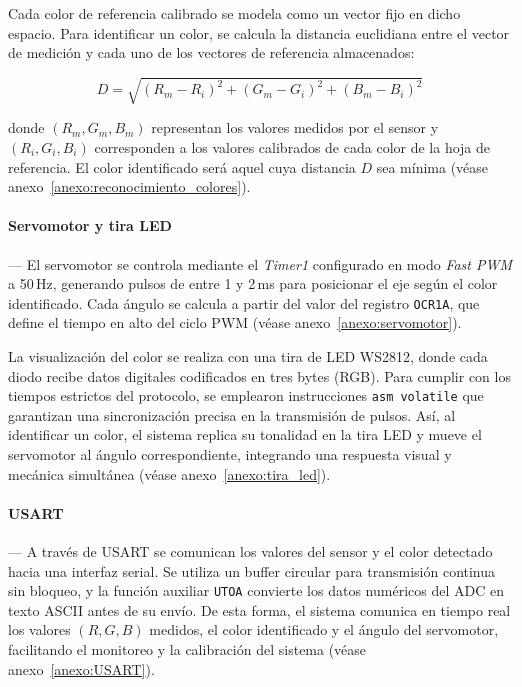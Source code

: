     \vspace{1em}

    Cada color de referencia calibrado se modela como un vector fijo en dicho espacio. Para identificar un color, se calcula la distancia euclidiana entre el vector de medición y cada uno de los vectores de referencia almacenados:

    \begin{equation}\label{eq:distancia_color}
    D = \sqrt{(R_m - R_i)^2 + (G_m - G_i)^2 + (B_m - B_i)^2}
    \end{equation}

    donde $(R_m, G_m, B_m)$ representan los valores medidos por el sensor y $(R_i, G_i, B_i)$ corresponden a los valores calibrados de cada color de la hoja de referencia. El color identificado será aquel cuya distancia $D$ sea mínima (véase anexo~\ref{anexo:reconocimiento_colores}).

    \paragraph*{\textbf{Servomotor y tira LED}}---
    El servomotor se controla mediante el \textit{Timer1} configurado en modo \textit{Fast PWM} a 50\,Hz, generando pulsos de entre 1 y 2\,ms para posicionar el eje según el color identificado. Cada ángulo se calcula a partir del valor del registro \texttt{OCR1A}, que define el tiempo en alto del ciclo PWM (véase anexo~\ref{anexo:servomotor}).

    \vspace{1em}

    La visualización del color se realiza con una tira de LED WS2812, donde cada diodo recibe datos digitales codificados en tres bytes (RGB). Para cumplir con los tiempos estrictos del protocolo, se emplearon instrucciones \texttt{asm volatile} que garantizan una sincronización precisa en la transmisión de pulsos. Así, al identificar un color, el sistema replica su tonalidad en la tira LED y mueve el servomotor al ángulo correspondiente, integrando una respuesta visual y mecánica simultánea (véase anexo~\ref{anexo:tira_led}).

    \vspace{1em}

    \paragraph*{\textbf{USART}}---
   A través de USART se comunican los valores del sensor y el color detectado hacia una interfaz serial. Se utiliza un buffer circular para transmisión continua sin bloqueo, y la función auxiliar \texttt{UTOA} convierte los datos numéricos del ADC en texto ASCII antes de su envío. De esta forma, el sistema comunica en tiempo real los valores $(R, G, B)$ medidos, el color identificado y el ángulo del servomotor, facilitando el monitoreo y la calibración del sistema (véase anexo~\ref{anexo:USART}).

